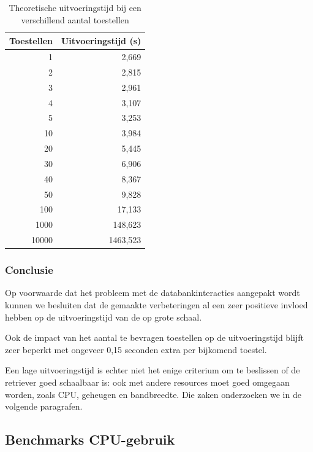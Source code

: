\begin{table}[h]
\centering
\begin{tabular}{@{}rr@{}}
\toprule
Toestellen & Uitvoeringstijd (s) \\ \midrule
1          & 2,669               \\
2          & 2,815               \\
3          & 2,961               \\
4          & 3,107               \\
5          & 3,253               \\
10         & 3,984               \\
20         & 5,445               \\
30         & 6,906               \\
40         & 8,367               \\
50         & 9,828               \\
100        & 17,133              \\
1000       & 148,623             \\
10000      & 1463,523            \\ \bottomrule
\end{tabular}
\caption{Theoretische uitvoeringstijd bij een verschillend aantal toestellen}
\label{tabel-theoretische-uitvoeringstijd}
\end{table}

\subsubsection{Conclusie}

Op voorwaarde dat het probleem met de databankinteracties aangepakt wordt kunnen we besluiten dat de gemaakte verbeteringen
al een zeer positieve invloed hebben op de uitvoeringstijd van de \nwmretriever{} op grote schaal.

Ook de impact van het aantal te bevragen toestellen op de uitvoeringstijd blijft zeer beperkt met ongeveer 0,15 seconden extra per bijkomend toestel.

Een lage uitvoeringstijd is echter niet het enige criterium om te beslissen of de retriever goed schaalbaar is:
ook met andere resources moet goed omgegaan worden, zoals CPU, geheugen en bandbreedte.
Die zaken onderzoeken we in de volgende paragrafen.


\subsection{Benchmarks CPU-gebruik}
\label{cpu-gebruik}

